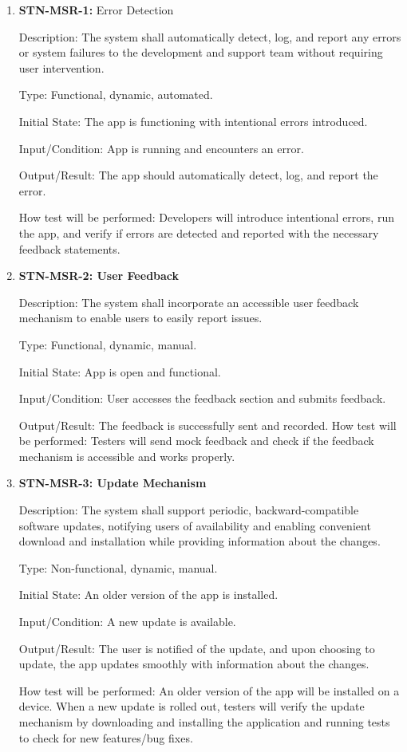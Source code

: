 \documentclass[12pt, titlepage]{article}
\begin{document}
    \begin{enumerate}

        \item {\textbf{STN-MSR-1:} Error Detection}

        Description: The system shall automatically detect, log, and report any errors or system failures to the development and support team without requiring user intervention.

        Type: Functional, dynamic, automated.

        Initial State: The app is functioning with intentional errors introduced.

        Input/Condition: App is running and encounters an error.

        Output/Result: The app should automatically detect, log, and report the error.

        How test will be performed: Developers will introduce intentional errors, run the app, and verify if errors are detected and reported with the necessary feedback statements.


        \item{\textbf{STN-MSR-2: User Feedback}}

        Description: The system shall incorporate an accessible user feedback mechanism to enable users to easily report issues.

        Type: Functional, dynamic, manual.

        Initial State: App is open and functional.

        Input/Condition: User accesses the feedback section and submits feedback.

        Output/Result: The feedback is successfully sent and recorded.
        How test will be performed: Testers will send mock feedback and check if the feedback mechanism is accessible and works properly.


        \item{\textbf{STN-MSR-3: Update Mechanism}}

        Description: The system shall support periodic, backward-compatible software updates, notifying users of availability and enabling convenient download and installation while providing information about the changes.

        Type: Non-functional, dynamic, manual.

        Initial State: An older version of the app is installed.

        Input/Condition: A new update is available.

        Output/Result: The user is notified of the update, and upon choosing to update, the app updates smoothly with information about the changes.

        How test will be performed: An older version of the app will be installed on a device. When a new update is rolled out, testers will verify the update mechanism by downloading and installing the application and running tests to check for new features/bug fixes.

    \end{enumerate}
\end{document}
